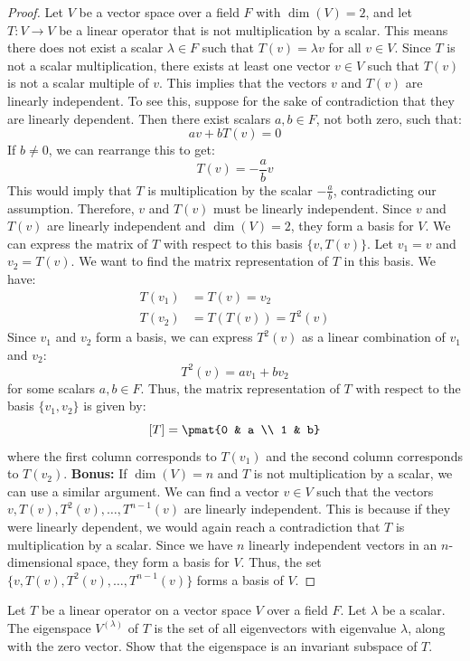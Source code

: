 \documentclass[openany]{book}
\begin{document}
\begin{proof}
Let $V$ be a vector space over a field $F$ with $\dim(V) = 2$, and let $T: V \to V$ be a linear operator that is not multiplication by a scalar. This means there does not exist a scalar $\lambda \in F$ such that $T(v) = \lambda v$ for all $v \in V$.
Since $T$ is not a scalar multiplication, there exists at least one vector $v \in V$ such that $T(v)$ is not a scalar multiple of $v$. This implies that the vectors $v$ and $T(v)$ are linearly independent. To see this, suppose for the sake of contradiction that they are linearly dependent. Then there exist scalars $a, b \in F$, not both zero, such that:
$$a v + b T(v) = 0$$
If $b \neq 0$, we can rearrange this to get:
$$T(v) = -\frac{a}{b} v$$
This would imply that $T$ is multiplication by the scalar $-\frac{a}{b}$, contradicting our assumption. Therefore, $v$ and $T(v)$ must be linearly independent.
Since $v$ and $T(v)$ are linearly independent and $\dim(V) = 2$, they form a basis for $V$. We can express the matrix of $T$ with respect to this basis $\{v, T(v)\}$.
Let $v_1 = v$ and $v_2 = T(v)$. We want to find the matrix representation of $T$ in this basis. We have:
\[\begin{aligned}
T(v_1) &= T(v) = v_2 \\
T(v_2) &= T(T(v)) = T^2(v)
\end{aligned}\]
Since $v_1$ and $v_2$ form a basis, we can express $T^2(v)$ as a linear combination of $v_1$ and $v_2$:
$$T^2(v) = a v_1 + b v_2$$
for some scalars $a, b \in F$. Thus, the matrix representation of $T$ with respect to the basis $\{v_1, v_2\}$ is given by:$$[T] = \pmat{0 & a \\ 1 & b}$$
where the first column corresponds to $T(v_1)$ and the second column corresponds to $T(v_2)$.
\newline
\textbf{Bonus:} If $\dim(V) = n$ and $T$ is not multiplication by a scalar, we can use a similar argument. We can find a vector $v \in V$ such that the vectors $v, T(v), T^2(v), \ldots, T^{n-1}(v)$ are linearly independent. This is because if they were linearly dependent, we would again reach a contradiction that $T$ is multiplication by a scalar. Since we have $n$ linearly independent vectors in an $n$-dimensional space, they form a basis for $V$. Thus, the set $\{v, T(v), T^2(v), \ldots, T^{n-1}(v)\}$ forms a basis of $V$. 
\end{proof}
\begin{exercise}
    Let $T$ be a linear operator on a vector space $V$ over a field $F$. Let $\lambda$ be a scalar. The eigenspace $V^{(\lambda)}$ of $T$ is the set of all eigenvectors with eigenvalue $\lambda$, along with the zero vector. Show that the eigenspace is an invariant subspace of $T$.
\end{exercise}
\end{document}
